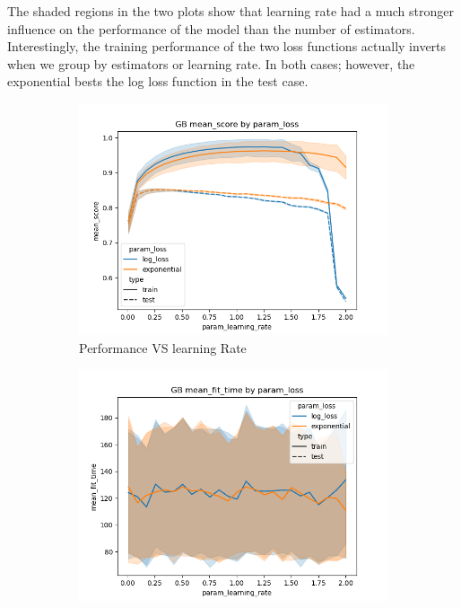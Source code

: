 \documentclass[12pt]{article}
\begin{document}
The shaded regions in the two plots show that learning rate had a much stronger influence on the performance of the model 
than the number of estimators. Interestingly, the training performance of the two loss functions actually inverts when 
we group by estimators or learning rate. In both cases; however, the exponential bests the log loss function in the 
test case.
\begin{figure}
  \begin{subfigure}{.5\textwidth}
  \includegraphics[width=.95\textwidth]{../results/gb/param_loss_mean_score_param_learning_rate.png}
    \caption{Performance VS learning Rate}
    \end{subfigure}%
  \begin{subfigure}{.5\textwidth}
  \includegraphics[width=.95\textwidth]{../results/gb/param_loss_mean_fit_time_param_learning_rate.png}

\end{subfigure}
\end{figure}
\end{document}
